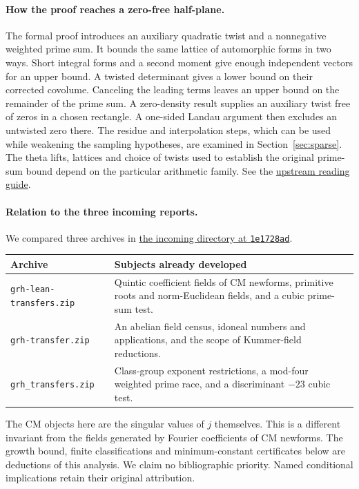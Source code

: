 \documentclass[11pt]{article}
\theoremstyle{remark}\newtheorem{remark}[theorem]{Remark}
\begin{document}
\paragraph{How the proof reaches a zero-free half-plane.}
The formal proof introduces an auxiliary quadratic twist and a nonnegative weighted prime sum. It bounds the same lattice of automorphic forms in two ways. Short integral forms and a second moment give enough independent vectors for an upper bound. A twisted determinant gives a lower bound on their corrected covolume. Canceling the leading terms leaves an upper bound on the remainder of the prime sum. A zero-density result supplies an auxiliary twist free of zeros in a chosen rectangle. A one-sided Landau argument then excludes an untwisted zero there. The residue and interpolation steps, which can be used while weakening the sampling hypotheses, are examined in Section~\ref{sec:sparse}. The theta lifts, lattices and choice of twists used to establish the original prime-sum bound depend on the particular arithmetic family. See the \href{https://github.com/lsernau/grh-lean/blob/72fead102f663d5c7a407964a13dc0cf9d977207/grh/GUIDE.md}{upstream reading guide}.

\paragraph{Relation to the three incoming reports.}
We compared three archives in \href{https://github.com/VladimirReshetnikov/ProveIt/tree/1e1728ad221d69e48fea09bf754b73422af44943/docs/incoming}{the incoming directory at \texttt{1e1728ad}}.
\begin{center}\small
\begin{tabular}{@{}p{.30\linewidth}p{.65\linewidth}@{}}
\toprule
Archive & Subjects already developed\\ \midrule
\texttt{grh-lean-transfers.zip} & Quintic coefficient fields of CM newforms, primitive roots and norm-Euclidean fields, and a cubic prime-sum test.\\
\texttt{grh-transfer.zip} & An abelian field census, idoneal numbers and applications, and the scope of Kummer-field reductions.\\
\texttt{grh\_transfers.zip} & Class-group exponent restrictions, a mod-four weighted prime race, and a discriminant $-23$ cubic test.\\
\bottomrule
\end{tabular}\end{center}
The CM objects here are the singular values of $j$ themselves. This is a different invariant from the fields generated by Fourier coefficients of CM newforms. The growth bound, finite classifications and minimum-constant certificates below are deductions of this analysis. We claim no bibliographic priority. Named conditional implications retain their original attribution.
\end{document}
